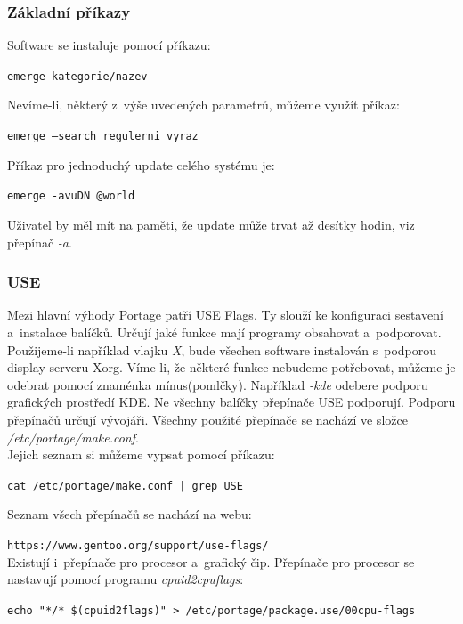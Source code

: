 \documentclass[12pt,a4paper,twoside,]{article}
\begin{document}
{{{{{{{\subsubsection{\textsf{Základní příkazy}}
Software se instaluje pomocí příkazu:  

 \texttt{emerge kategorie/nazev} 
 
\hspace{-1.5em}Nevíme-li, některý z~výše uvedených parametrů, můžeme využít příkaz:

\texttt{emerge --search regulerni\_vyraz} 

\hspace{-1.5em}Příkaz pro jednoduchý update celého systému je:

\texttt{emerge -avuDN @world}

\hspace*{-1.5em}Uživatel by měl mít na paměti, že update může trvat až desítky hodin, viz přepínač \textit{-a}. %

\subsubsection{\textsf{USE}}
Mezi hlavní výhody Portage patří USE Flags. Ty slouží ke konfiguraci sestavení a~instalace balíčků. Určují jaké funkce mají programy obsahovat a~podporovat.\\
Použijeme-li například vlajku \textit{X}, bude všechen software instalován s~podporou display serveru Xorg. Víme-li, že některé funkce nebudeme potřebovat, můžeme je odebrat pomocí znaménka mínus(pomlčky). Například \textit{-kde} odebere podporu grafických prostředí KDE.
Ne všechny balíčky přepínače USE podporují. Podporu přepínačů určují vývojáři.
Všechny použité přepínače se nachází ve složce \textit{/etc/portage/make.conf}. \\
Jejich seznam si můžeme vypsat pomocí příkazu:

\texttt{cat /etc/portage/make.conf | grep USE}

\hspace{-1.5em}Seznam všech přepínačů se nachází na webu:

\texttt{https://www.gentoo.org/support/use-flags/}\\

\hspace{-1.5em}Existují i~přepínače pro procesor a~grafický čip. Přepínače pro procesor se nastavují pomocí programu \textit{cpuid2cpuflags}:


\texttt{echo "*/* \$(cpuid2flags)" > /etc/portage/package.use/00cpu-flags}\\

}}}}}}}
\end{document}
